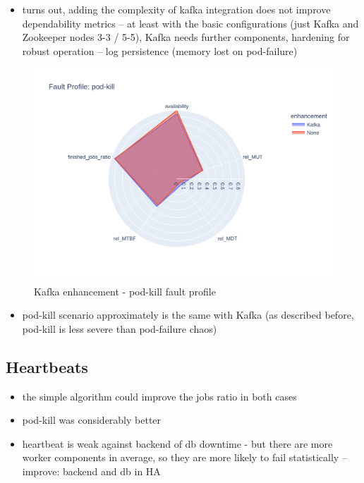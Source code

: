 \begin{itemize}
	\item turns out, adding the complexity of kafka integration does not improve dependability metrics -- at least with the basic configurations (just Kafka and Zookeeper nodes 3-3 / 5-5), Kafka needs further components, hardening for robust operation -- log persistence (memory lost on pod-failure)
\end{itemize}

\begin{figure}[h]
	\centering
	\includegraphics[width=140mm, keepaspectratio]{figures/kafka_with_base_pod-kill.png}
	\caption{Kafka enhancement - pod-kill fault profile}
	\label{fig:kafka-results-pod-kill}
\end{figure}

\begin{itemize}
	\item pod-kill scenario approximately is the same with Kafka (as described before, pod-kill is less severe than pod-failure chaos)
\end{itemize}

\subsection{Heartbeats}

\begin{itemize}
	\item the simple algorithm could improve the jobs ratio in both cases
	\item pod-kill was considerably better
	\item heartbeat is weak against backend of db downtime - but there are more worker components in average, so they are more likely to fail statistically -- improve: backend and db in HA
\end{itemize}

